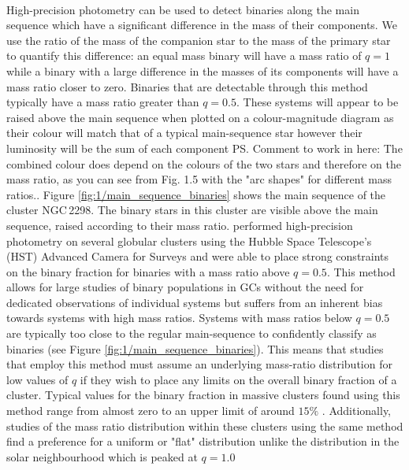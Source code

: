 \paragraph{}
High-precision photometry can be used to detect binaries along the main sequence which have a
significant difference in the mass of their components. We use the ratio of the mass of the
companion star to the mass of the primary star to quantify this difference: an equal mass binary
will have a mass ratio of $q=1$ while a binary with a large difference in the masses of its
components will have a mass ratio closer to zero. Binaries that are detectable through this method
typically have a mass ratio greater than $q=0.5$. These systems will appear to be raised above the
main sequence when plotted on a colour-magnitude diagram as their colour will match that of a
typical main-sequence star however their luminosity will be the sum of each component \ps{Comment to
	work in here: The combined colour does depend on the colours of the two stars and therefore on the
	mass ratio, as you can see from Fig. 1.5 with the "arc shapes" for different mass ratios.}. Figure
\ref{fig:1/main_sequence_binaries} shows the main sequence of the cluster NGC\,2298. The binary
stars in this cluster are visible above the main sequence, raised according to their mass ratio.
\citet{Milone2012} performed high-precision photometry on several globular clusters using the Hubble
Space Telescope's (HST) Advanced Camera for Surveys and were able to place strong constraints on the
binary fraction for binaries with a mass ratio above $q=0.5$. This method allows for large studies
of binary populations in GCs without the need for dedicated observations of individual systems but
suffers from an inherent bias towards systems with high mass ratios. Systems with mass ratios below
$q=0.5$ are typically too close to the regular main-sequence to confidently classify as binaries
(see Figure \ref{fig:1/main_sequence_binaries}). This means that studies that employ this method
must assume an underlying mass-ratio distribution for low values of $q$ if they wish to place any
limits on the overall binary fraction of a cluster. Typical values for the binary fraction in
massive clusters found using this method range from almost zero to an upper limit of around $15\%$
\citep{Milone2012}. Additionally, studies of the mass ratio distribution within these clusters using
the same method find a preference for a uniform or "flat" distribution unlike the distribution in
the solar neighbourhood which is peaked at $q=1.0$ \citep{Milone2012,Fisher2005,Reggiani2013}


